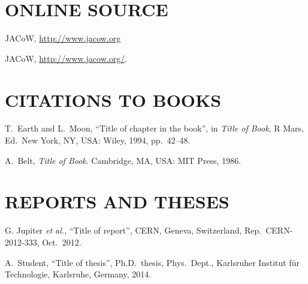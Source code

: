 \vspace*{-.5\baselineskip}
\section{ONLINE SOURCE}

\begin{thebibliography}{99} %
  \setcounter{enumi}{11}
		JACoW, \url{http://www.jacow.org} 

  \setcounter{enumi}{11}
		JACoW, \url{http://www.jacow.org/}.  

\end{thebibliography}

\section{CITATIONS TO BOOKS}

\begin{thebibliography}{99} %
	\setcounter{enumi}{12}
		T.~Earth and L.~Moon,
		“Title of chapter in the book”,
		in \emph{Title of Book}, R Mars, Ed.\ New York, NY, USA:
		Wiley, 1994, pp.\ 42--48. 
	
		A.~Belt, \emph{Title of Book}. Cambridge, MA, USA:
		MIT Press, 1986. 
\end{thebibliography}

\section{REPORTS AND THESES}

\begin{thebibliography}{99} %
	\setcounter{enumi}{14}
		G. Jupiter \emph{et al.},
		“Title of report”, CERN, Geneva, Switzerland,
		Rep.\ CERN-2012-333, Oct.\ 2012.

		A.~Student, “Title of thesis”,
		Ph.D.\ thesis, Phys.\ Dept.,
		Karlsruher Institut für Technologie, Karlsruhe,
		Germany, 2014.
\end{thebibliography}

